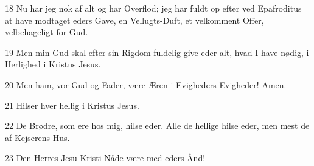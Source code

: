 \par 18 Nu har jeg nok af alt og har Overflod; jeg har fuldt op efter ved Epafroditus at have modtaget eders Gave, en Vellugts-Duft, et velkomment Offer, velbehageligt for Gud.
\par 19 Men min Gud skal efter sin Rigdom fuldelig give eder alt, hvad I have nødig, i Herlighed i Kristus Jesus.
\par 20 Men ham, vor Gud og Fader, være Æren i Evigheders Evigheder! Amen.
\par 21 Hilser hver hellig i Kristus Jesus.
\par 22 De Brødre, som ere hos mig, hilse eder. Alle de hellige hilse eder, men mest de af Kejserens Hus.
\par 23 Den Herres Jesu Kristi Nåde være med eders Ånd!



